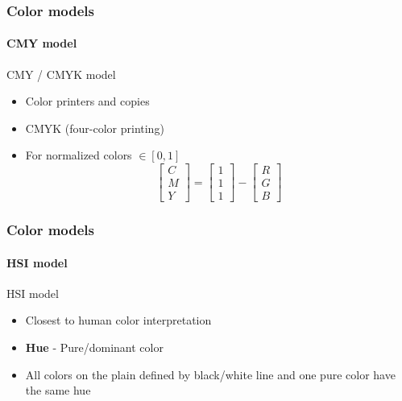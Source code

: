 \documentclass{beamer}
\begin{document}
\begin{frame}
\frametitle{Color models}
\framesubtitle{CMY model}
\begin{block}{CMY / CMYK model}
\footnotesize{
\begin{itemize}
\item Color printers and copies 
\item CMYK (four-color printing)
\item For normalized colors $\in [0, 1]$
\[
\begin{bmatrix}
C\\M\\Y
\end{bmatrix} =
\begin{bmatrix}
1\\1\\1
\end{bmatrix} -
\begin{bmatrix}
R\\G\\B
\end{bmatrix} \] 
\end{itemize}}
\vspace{-0.3cm}
\end{block}
\end{frame}
\begin{frame}
\frametitle{Color models}
\framesubtitle{HSI model}
\begin{block}{HSI model}
\scriptsize{
\begin{itemize}
\item Closest to human color interpretation
\item \textbf{Hue} - Pure/dominant color
\item All colors on the plain defined by black/white line and one pure color have the same hue\\
\end{itemize}}
\end{block}
\end{frame}
\end{document}
